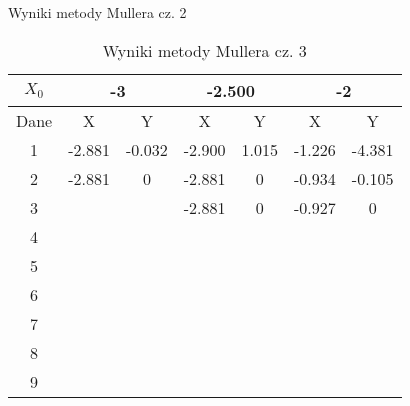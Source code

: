 \documentclass[a4paper, 11pt]{article}
\begin{document}
\begin{enumerate}
\begin{itemize}
\begin{table}[p]
\caption{Wyniki metody Mullera cz. 2}                                                                     
\label{table:Wyniki metody Mullera cz. 2}                                                                 
\end{table}                                                                                               
\begin{table}[p]                                                
\centering                                                   
\begin{tabular}{|c|c|c|c|c|c|c|}                             
\hline                                                       
\( X_0 \)  & \multicolumn{2}{c|}{-3 } & \multicolumn{2}{c|}{-2.500  }& \multicolumn{2}{c|}{-2 } \\ 
\hline                                                       
Dane & X & Y & X & Y & X & Y \\                             
\hline                                                       
1  & -2.881 & -0.032 & -2.900 & 1.015 & -1.226 & -4.381 \\
\hline                                                       
2  & -2.881 & 0 & -2.881 & 0 & -0.934 & -0.105 \\
\hline                                                       
3  &  &  & -2.881 & 0 & -0.927 & 0 \\  
\hline                                                       
4  &  &  &  &  &  &  \\     
\hline                                                       
5  &  &  &  &  &  &  \\     
\hline                                                       
6  &  &  &  &  &  &  \\     
\hline                                                       
7  &  &  &  &  &  &  \\     
\hline                                                       
8  &  &  &  &  &  &  \\     
\hline                                                       
9  &  &  &  &  &  &  \\     
\hline                                                       
\end{tabular}                                                
\caption{Wyniki metody Mullera cz. 3}                        
\label{table:Wyniki metody Mullera cz. 3}                    
\end{table}                                                  

\end{itemize}
\end{enumerate}
\end{document}
